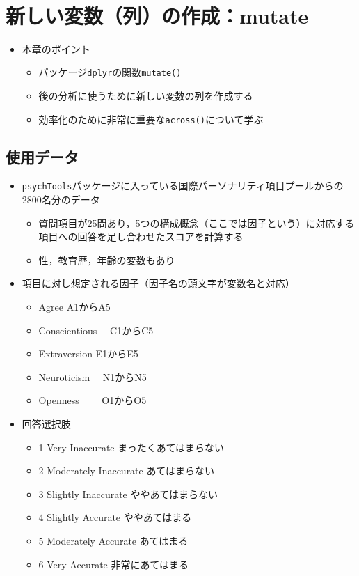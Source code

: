 \documentclass[
  xelatex,ja=standard, b5paper]{bxjsbook}
\providecommand{\tightlist}{%
  \setlength{\itemsep}{0pt}\setlength{\parskip}{0pt}}
\begin{document}
　

\hypertarget{mutate}{%
\chapter{新しい変数（列）の作成：mutate}\label{mutate}}

\begin{itemize}
\tightlist
\item
  本章のポイント

  \begin{itemize}
  \tightlist
  \item
    パッケージ\texttt{dplyr}の関数\texttt{mutate()}
  \item
    後の分析に使うために新しい変数の列を作成する
  \item
    効率化のために非常に重要な\texttt{across()}について学ぶ
  \end{itemize}
\end{itemize}

\hypertarget{mu-read}{%
\section{使用データ}\label{mu-read}}

\begin{itemize}
\tightlist
\item
  \texttt{psychTools}パッケージに入っている国際パーソナリティ項目プールからの2800名分のデータ

  \begin{itemize}
  \tightlist
  \item
    質問項目が25問あり，5つの構成概念（ここでは因子という）に対応する項目への回答を足し合わせたスコアを計算する
  \item
    性，教育歴，年齢の変数もあり
  \end{itemize}
\item
  項目に対し想定される因子（因子名の頭文字が変数名と対応）

  \begin{itemize}
  \tightlist
  \item
    Agree A1からA5
  \item
    Conscientious　 C1からC5
  \item
    Extraversion E1からE5
  \item
    Neuroticism　 N1からN5
  \item
    Openness　　 O1からO5
  \end{itemize}
\item
  回答選択肢

  \begin{itemize}
  \tightlist
  \item
    1 Very Inaccurate まったくあてはまらない
  \item
    2 Moderately Inaccurate あてはまらない
  \item
    3 Slightly Inaccurate ややあてはまらない
  \item
    4 Slightly Accurate ややあてはまる
  \item
    5 Moderately Accurate あてはまる
  \item
    6 Very Accurate 非常にあてはまる
  \end{itemize}
\end{itemize}
\end{document}
